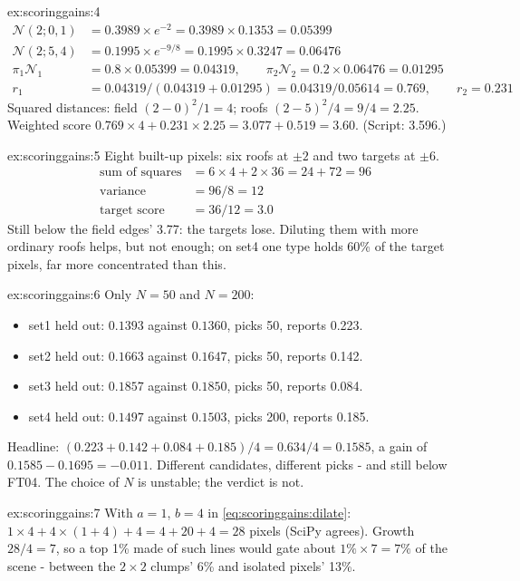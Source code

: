 \begin{solution}{ex:scoringgains:4}
\begin{align*}
\mathcal{N}(2; 0, 1) &= 0.3989 \times e^{-2} = 0.3989 \times 0.1353 = 0.05399\\
\mathcal{N}(2; 5, 4) &= 0.1995 \times e^{-9/8} = 0.1995 \times 0.3247 = 0.06476\\
\pi_1\mathcal{N}_1 &= 0.8 \times 0.05399 = 0.04319, \qquad \pi_2\mathcal{N}_2 = 0.2 \times 0.06476 = 0.01295\\
r_1 &= 0.04319 / (0.04319 + 0.01295) = 0.04319 / 0.05614 = 0.769, \qquad r_2 = 0.231
\end{align*}
Squared distances: field $(2 - 0)^2/1 = 4$; roofs $(2 - 5)^2/4 = 9/4 = 2.25$. Weighted score $0.769 \times 4 + 0.231 \times
2.25 = 3.077 + 0.519 = 3.60$. (Script: 3.596.)
\end{solution}

\begin{solution}{ex:scoringgains:5}
Eight built-up pixels: six roofs at $\pm 2$ and two targets at $\pm 6$.
\begin{align*}
\text{sum of squares} &= 6 \times 4 + 2 \times 36 = 24 + 72 = 96\\
\text{variance} &= 96 / 8 = 12\\
\text{target score} &= 36 / 12 = 3.0
\end{align*}
Still below the field edges' 3.77: the targets lose. Diluting them with more ordinary roofs helps, but not enough; on set4 one
type holds 60\% of the target pixels, far more concentrated than this.
\end{solution}

\begin{solution}{ex:scoringgains:6}
Only $N = 50$ and $N = 200$:
\begin{itemize}
\item set1 held out: $0.1393$ against $0.1360$, picks 50, reports 0.223.
\item set2 held out: $0.1663$ against $0.1647$, picks 50, reports 0.142.
\item set3 held out: $0.1857$ against $0.1850$, picks 50, reports 0.084.
\item set4 held out: $0.1497$ against $0.1503$, picks 200, reports 0.185.
\end{itemize}
Headline: $(0.223 + 0.142 + 0.084 + 0.185)/4 = 0.634/4 = 0.1585$, a gain of $0.1585 - 0.1695 = -0.011$. Different candidates,
different picks - and still below FT04. The choice of $N$ is unstable; the verdict is not.
\end{solution}

\begin{solution}{ex:scoringgains:7}
With $a = 1$, $b = 4$ in \eqref{eq:scoringgains:dilate}: $1 \times 4 + 4 \times (1 + 4) + 4 = 4 + 20 + 4 = 28$ pixels (SciPy
agrees). Growth $28 / 4 = 7$, so a top 1\% made of such lines would gate about $1\% \times 7 = 7\%$ of the scene - between
the $2 \times 2$ clumps' 6\% and isolated pixels' 13\%.
\end{solution}
